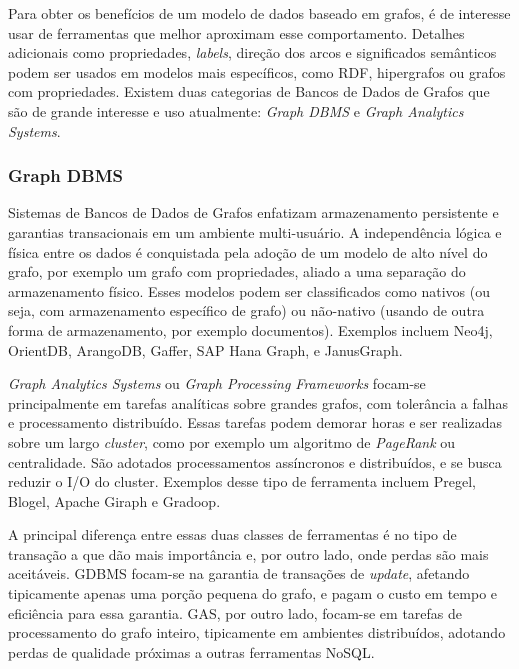 Para obter os benefícios de um modelo de dados baseado em grafos, é de interesse usar de ferramentas que melhor aproximam esse comportamento. Detalhes adicionais como propriedades, \emph{labels}, direção dos arcos e significados semânticos podem ser usados em modelos mais específicos, como RDF, hipergrafos ou grafos com propriedades. Existem duas categorias de Bancos de Dados de Grafos que são de grande interesse e uso atualmente: \emph{Graph DBMS} e \emph{Graph Analytics Systems}.

\subsubsection{Graph DBMS}
Sistemas de Bancos de Dados de Grafos enfatizam armazenamento persistente e garantias transacionais em um ambiente multi-usuário. A independência lógica e física entre os dados é conquistada pela adoção de um modelo de alto nível do grafo, por exemplo um grafo com propriedades, aliado a uma separação do armazenamento físico. Esses modelos podem ser classificados como nativos (ou seja, com armazenamento específico de grafo) ou não-nativo (usando de outra forma de armazenamento, por exemplo documentos). Exemplos incluem Neo4j, OrientDB, ArangoDB, Gaffer,
SAP Hana Graph, e JanusGraph.

\emph{Graph Analytics Systems} ou \emph{Graph Processing Frameworks} focam-se principalmente em tarefas analíticas sobre grandes grafos, com tolerância a falhas e processamento distribuído. Essas tarefas podem demorar horas e ser realizadas sobre um largo \emph{cluster}, como por exemplo um algoritmo de \emph{PageRank} ou centralidade. São adotados processamentos assíncronos e distribuídos, e se busca reduzir o I/O do cluster. Exemplos desse tipo de ferramenta incluem Pregel, Blogel, Apache Giraph e Gradoop.

A principal diferença entre essas duas classes de ferramentas é no tipo de transação a que dão mais importância e, por outro lado, onde perdas são mais aceitáveis. GDBMS focam-se na garantia de transações de \emph{update}, afetando tipicamente apenas uma porção pequena do grafo, e pagam o custo em tempo e eficiência para essa garantia. GAS, por outro lado, focam-se em tarefas de processamento do grafo inteiro, tipicamente em ambientes distribuídos, adotando perdas de qualidade próximas a outras ferramentas NoSQL.
